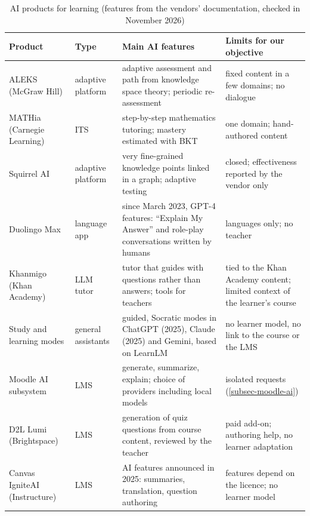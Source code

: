 \begin{table}[htbp]
\centering
\caption[AI products for learning]{AI products for learning (features from
the vendors' documentation, checked in November 2026)}
\label{tab-products}
\scriptsize
\begin{tabularx}{\textwidth}{@{}L{2.3cm}L{1.8cm}YY@{}}
\toprule
\textbf{Product} & \textbf{Type} & \textbf{Main AI features} & \textbf{Limits for our objective} \\
\midrule
ALEKS (McGraw Hill) \cite{aleks_site,doignon1999} & adaptive platform & adaptive assessment and path from knowledge space theory; periodic re-assessment & fixed content in a few domains; no dialogue \\
MATHia (Carnegie Learning) \cite{ritter2007} & ITS & step-by-step mathematics tutoring; mastery estimated with BKT & one domain; hand-authored content \\
Squirrel AI \cite{squirrelai_site} & adaptive platform & very fine-grained knowledge points linked in a graph; adaptive testing & closed; effectiveness reported by the vendor only \\
Duolingo Max \cite{duolingomax2023} & language app & since March 2023, GPT-4 features: \enquote{Explain My Answer} and role-play conversations written by humans & languages only; no teacher \\
Khanmigo (Khan Academy) \cite{khanmigo} & LLM tutor & tutor that guides with questions rather than answers; tools for teachers & tied to the Khan Academy content; limited context of the learner's course \\
Study and learning modes \cite{openai_studymode,anthropic_education,learnlm2024} & general assistants & guided, Socratic modes in ChatGPT (2025), Claude (2025) and Gemini, based on LearnLM & no learner model, no link to the course or the LMS \\
Moodle AI subsystem \cite{moodle_ai} & LMS & generate, summarize, explain; choice of providers including local models & isolated requests (\cref{subsec-moodle-ai}) \\
D2L Lumi (Brightspace) \cite{d2l_lumi} & LMS & generation of quiz questions from course content, reviewed by the teacher & paid add-on; authoring help, no learner adaptation \\
Canvas IgniteAI (Instructure) \cite{canvas_ignite} & LMS & AI features announced in 2025: summaries, translation, question authoring & features depend on the licence; no learner model \\
\bottomrule
\end{tabularx}
\end{table}

